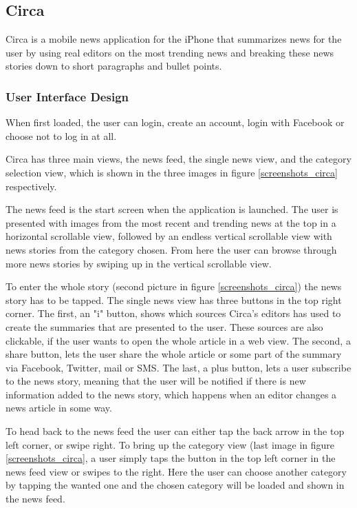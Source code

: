 \subsection{Circa}
Circa is a mobile news application for the iPhone that summarizes news for the user by using real editors on the most trending news and breaking these news stories down to short paragraphs and bullet points\cite{circa_about}.

\subsubsection{User Interface Design}
When first loaded, the user can login, create an account, login with Facebook or choose not to log in at all.

Circa has three main views, the news feed, the single news view, and the category selection view, which is shown in the three images in figure \ref{screenshots_circa} respectively.

The news feed is the start screen when the application is launched. The user is presented with images from the most recent and trending news at the top in a horizontal scrollable view, followed by an endless vertical scrollable view with news stories from the category chosen. From here the user can browse through more news stories by swiping up in the vertical scrollable view.

To enter the whole story (second picture in figure \ref{screenshots_circa}) the news story has to be tapped. The single news view has three buttons in the top right corner. The first, an "i" button, shows which sources Circa's editors has used to create the summaries that are presented to the user. These sources are also clickable, if the user wants to open the whole article in a web view. The second, a share button, lets the user share the whole article or some part of the summary via Facebook, Twitter, mail or SMS. The last, a plus button, lets a user subscribe to the news story, meaning that the user will be notified if there is new information added to the news story, which happens when an editor changes a news article in some way.

To head back to the news feed the user can either tap the back arrow in the top left corner, or swipe right. To bring up the category view (last image in figure \ref{screenshots_circa}, a user simply taps the button in the top left corner in the news feed view or swipes to the right. Here the user can choose another category by tapping the wanted one and the chosen category will be loaded and shown in the news feed.

